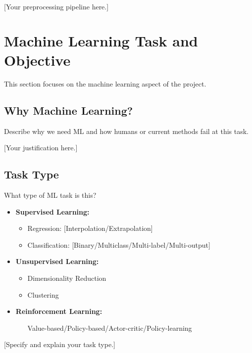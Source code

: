 \documentclass[aps,prl,preprint,groupedaddress]{revtex4-2}
\begin{document}
[Your preprocessing pipeline here.]

\section{Machine Learning Task and Objective}
\label{sec:ml_task}

This section focuses on the machine learning aspect of the project.

\subsection{Why Machine Learning?}
Describe why we need ML and how humans or current methods fail at this task.

[Your justification here.]

\subsection{Task Type}
What type of ML task is this?

\begin{itemize}
    \item \textbf{Supervised Learning:}
    \begin{itemize}
        \item Regression: [Interpolation/Extrapolation]
        \item Classification: [Binary/Multiclass/Multi-label/Multi-output]
    \end{itemize}
    \item \textbf{Unsupervised Learning:}
    \begin{itemize}
        \item Dimensionality Reduction
        \item Clustering
    \end{itemize}
    \item \textbf{Reinforcement Learning:}
    \begin{itemize}
        \item [Value-based/Policy-based/Actor-critic/Policy-learning]
    \end{itemize}
\end{itemize}

[Specify and explain your task type.]

\end{document}
